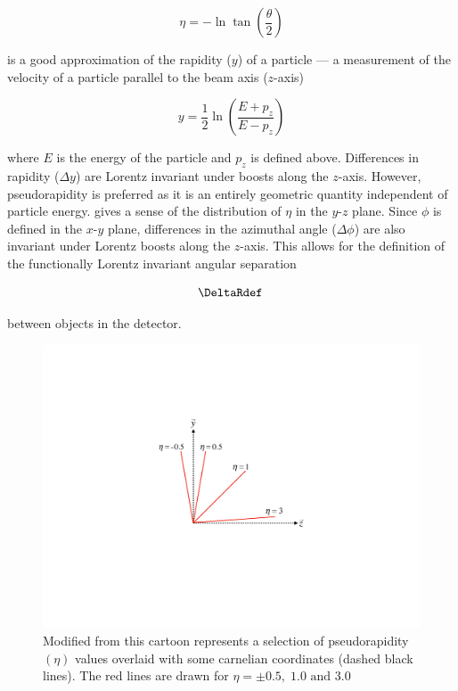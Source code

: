 \begin{equation}
 \eta = -\ln \tan \left( \frac{\theta}{2} \right)
\end{equation}

is a good approximation of the rapidity ($y$) of a particle --- a measurement of
the velocity of a particle parallel to the beam axis ($z$-axis)

\begin{equation}
y = \frac{1}{2} \ln \left( \frac{E + p_{z}}{E - p_{z}} \right)
\end{equation}

where $E$ is the energy of the particle and $p_{z}$ is defined above.
Differences in rapidity ($\Delta y$) are Lorentz invariant under boosts along
the $z$-axis.  However, pseudorapidity is preferred as it is an entirely
geometric quantity independent of particle energy. 
gives a sense of the distribution of $\eta$ in the $y$-$z$ plane. Since $\phi$
is defined in the $x$-$y$ plane, differences in the azimuthal angle
($\Delta\phi$) are also invariant under Lorentz boosts along the $z$-axis.
This allows for the definition of the functionally Lorentz invariant angular
separation

\begin{equation}
 \DeltaRdef \,
\end{equation}

between objects in the detector.

\begin{figure}[!htbp]
  \begin{center}
    \includegraphics[width=0.5\linewidth]{figures/atlas/pseudorapidity}
    \caption{Modified from \cite{Stark:2317296} this cartoon represents a
selection of pseudorapidity $(\eta)$ values overlaid with some carnelian
coordinates (dashed black lines).  The red lines are drawn for $\eta = \pm
0.5, \; 1.0 \text{ and } 3.0$ }
    \label{fig:pseudorapidity}
  \end{center}
\end{figure}

